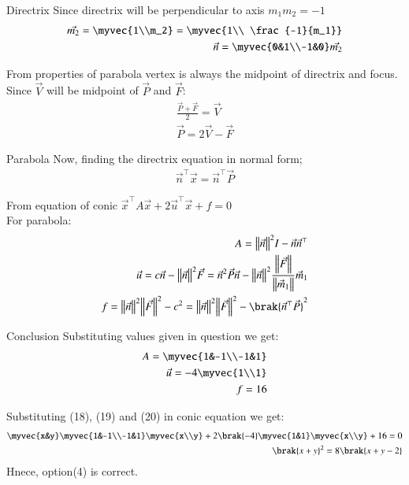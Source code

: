 \documentclass{beamer}
\begin{document}
\begin{frame}{Directrix}
Since directrix will be perpendicular to axis $m_1m_2=-1$
\begin{align}
    \vec{m_2} = \myvec{1\\m_2} = \myvec{1\\ \frac{-1}{m_1}}\\
    \vec{n} = \myvec{0&1\\-1&0}\vec{m_2}
\end{align}

From properties of parabola vertex is always the midpoint of directrix and focus.
Since $\vec{V}$ will be midpoint of $\vec{P}$ and $\vec{F}$:
\begin{align}
    \frac{\vec{P}+\vec{F}}{2} = \vec{V}\\
    \vec{P}=2\vec{V}-\vec{F}
\end{align}
\end{frame}

\begin{frame}{Parabola}
Now, finding the directrix equation in normal form;
\begin{align}
    \vec{n}^\top\vec{x}=\vec{n}^\top\vec{P}
\end{align}

From equation of conic $\vec{x}^\top A\vec{x}+2\vec{u}^\top\vec{x}+f=0$\\
For parabola:
\begin{align}
    A=\norm{\vec{n}}^2I-\vec{n}\vec{n}^\top\\
    \vec{u}=c\vec{n}-\norm{\vec{n}}^2\vec{F}=\vec{n}^2\vec{P}\vec{n}-\norm{\vec{n}}^2\frac{\norm{\vec{F}}}{\norm{\vec{m}_1}}\vec{m}_1\\
    f=\norm{\vec{n}}^2\norm{\vec{F}}^2-c^2=\norm{\vec{n}}^2\norm{\vec{F}}^2-\brak{\vec{n}^\top\vec{P}}^2
\end{align}

\end{frame}

\begin{frame}{Conclusion}
Substituting values given in question we get:
\begin{align}
    A=\myvec{1&-1\\-1&1}\\
    \vec{u}=-4\myvec{1\\1}\\
    f=16
\end{align}

Substituting (18), (19) and (20) in conic equation we get:
\begin{align}
    \myvec{x&y}\myvec{1&-1\\-1&1}\myvec{x\\y}+2\brak{-4}\myvec{1&1}\myvec{x\\y}+16=0\\
    \brak{x+y}^2=8\brak{x+y-2}
\end{align}
Hnece, option(4) is correct.
\end{frame}
\end{document}

